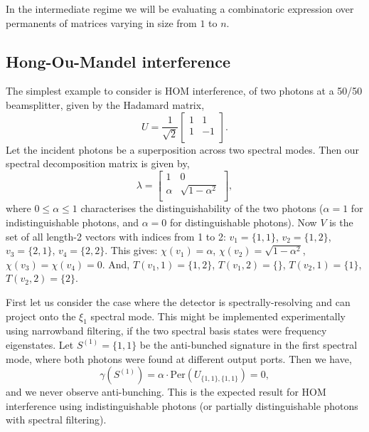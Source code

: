 \documentclass[aps,pra,twocolumn,amsmath,amssymb,nofootinbib,superscriptaddress]{revtex4}
\begin{document}
In the intermediate regime we will be evaluating a combinatoric expression over permanents of matrices varying in size from $1$ to $n$.

%
%

\subsection{Hong-Ou-Mandel interference}

The simplest example to consider is HOM interference, of two photons at a 50/50 beamsplitter, given by the Hadamard matrix,
\begin{equation}
U = \frac{1}{\sqrt{2}} \left[ \begin{array}{cc}
1 & 1 \\
1 & -1 \\
\end{array} \right].
\end{equation}
Let the incident photons be a superposition across two spectral modes. Then our spectral decomposition matrix is given by,
\begin{equation}
\lambda = \left[ \begin{array}{cc}
1 & 0 \\
\alpha & \sqrt{1-\alpha^2} \\
\end{array} \right],
\end{equation}
where \mbox{$0\leq \alpha\leq 1$} characterises the distinguishability of the two photons (\mbox{$\alpha=1$} for indistinguishable photons, and \mbox{$\alpha=0$} for distinguishable photons). Now $V$ is the set of all length-2 vectors with indices from 1 to 2: \mbox{$v_1=\{1,1\}$}, \mbox{$v_2=\{1,2\}$}, \mbox{$v_3=\{2,1\}$}, \mbox{$v_4=\{2,2\}$}. This gives: \mbox{$\chi(v_1)=\alpha$}, \mbox{$\chi(v_2)=\sqrt{1-\alpha^2}$}, \mbox{$\chi(v_3)=\chi(v_4)=0$}. And, \mbox{$T(v_1,1)=\{1,2\}$}, \mbox{$T(v_1,2)=\{\}$}, \mbox{$T(v_2,1)=\{1\}$}, \mbox{$T(v_2,2)=\{2\}$}.

First let us consider the case where the detector is spectrally-resolving and can project onto the $\xi_1$ spectral mode. This might be implemented experimentally using narrowband filtering, if the two spectral basis states were frequency eigenstates. Let \mbox{$S^{(1)}=\{1,1\}$} be the anti-bunched signature in the first spectral mode, where both photons were found at different output ports. Then we have,
\begin{equation}
\gamma(S^{(1)}) = \alpha \cdot\mathrm{Per}\left(U_{\{1,1\},\{1,1\}}\right) = 0,
\end{equation}
and we never observe anti-bunching. This is the expected result for HOM interference using indistinguishable photons (or partially distinguishable photons with spectral filtering).
\end{document}
